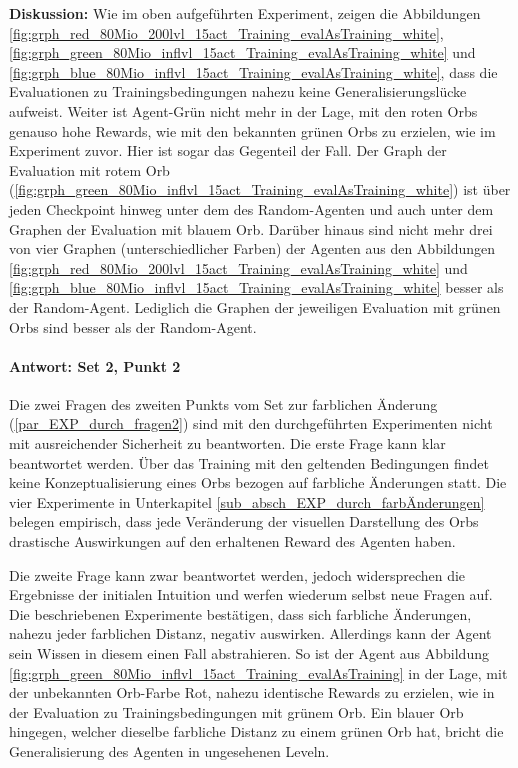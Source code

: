 \textbf{Diskussion:} Wie im oben aufgeführten Experiment, zeigen die Abbildungen \ref{fig:grph_red_80Mio_200lvl_15act_Training_evalAsTraining_white}, \ref{fig:grph_green_80Mio_inflvl_15act_Training_evalAsTraining_white} und \ref{fig:grph_blue_80Mio_inflvl_15act_Training_evalAsTraining_white}, dass die Evaluationen zu Trainingsbedingungen nahezu keine Generalisierungslücke aufweist. Weiter ist Agent-Grün nicht mehr in der Lage, mit den roten Orbs genauso hohe Rewards, wie mit den bekannten grünen Orbs zu erzielen, wie im Experiment zuvor. Hier ist sogar das Gegenteil der Fall. Der Graph der Evaluation mit rotem Orb (\ref{fig:grph_green_80Mio_inflvl_15act_Training_evalAsTraining_white}) ist über jeden Checkpoint hinweg unter dem des Random-Agenten und auch unter dem Graphen der Evaluation mit blauem Orb. Darüber hinaus sind nicht mehr drei von vier Graphen (unterschiedlicher Farben) der Agenten aus den Abbildungen \ref{fig:grph_red_80Mio_200lvl_15act_Training_evalAsTraining_white} und \ref{fig:grph_blue_80Mio_inflvl_15act_Training_evalAsTraining_white} besser als der Random-Agent. Lediglich die Graphen der jeweiligen Evaluation mit grünen Orbs sind besser als der Random-Agent. \\

\paragraph{Antwort: Set 2, Punkt 2}
Die zwei Fragen des zweiten Punkts vom Set zur farblichen Änderung (\ref{par_EXP_durch_fragen2}) sind mit den durchgeführten Experimenten nicht mit ausreichender Sicherheit zu beantworten. Die erste Frage kann klar beantwortet werden. Über das Training mit den geltenden Bedingungen findet keine Konzeptualisierung eines Orbs bezogen auf farbliche Änderungen statt. Die vier Experimente in Unterkapitel \ref{sub_absch_EXP_durch_farbÄnderungen} belegen empirisch, dass jede Veränderung der visuellen Darstellung des Orbs drastische Auswirkungen auf den erhaltenen Reward des Agenten haben. 

Die zweite Frage kann zwar  beantwortet werden, jedoch widersprechen die Ergebnisse der initialen Intuition und werfen wiederum selbst neue Fragen auf. Die beschriebenen Experimente bestätigen, dass sich farbliche Änderungen, nahezu jeder farblichen Distanz, negativ auswirken. Allerdings kann der Agent sein Wissen in diesem einen Fall abstrahieren. So ist der Agent aus Abbildung \ref{fig:grph_green_80Mio_inflvl_15act_Training_evalAsTraining} in der Lage, mit der unbekannten Orb-Farbe Rot, nahezu identische Rewards zu erzielen, wie in der Evaluation zu Trainingsbedingungen mit grünem Orb. Ein blauer Orb hingegen, welcher dieselbe farbliche Distanz zu einem grünen Orb hat, bricht die Generalisierung des Agenten in ungesehenen Leveln. 



